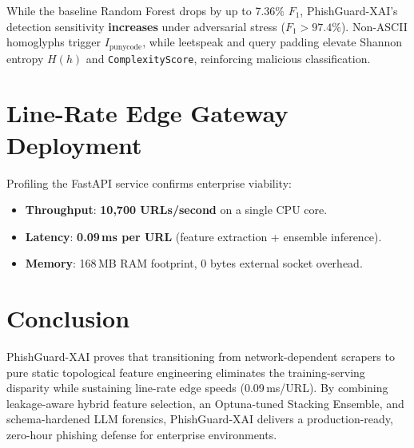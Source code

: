 \documentclass[conference]{IEEEtran}
\begin{document}
While the baseline Random Forest drops by up to 7.36\% $F_1$, PhishGuard-XAI's detection sensitivity \textbf{increases} under adversarial stress ($F_1 > 97.4\%$). Non-ASCII homoglyphs trigger $I_{\text{punycode}}$, while leetspeak and query padding elevate Shannon entropy $H(h)$ and \texttt{ComplexityScore}, reinforcing malicious classification.

\section{Line-Rate Edge Gateway Deployment}
Profiling the FastAPI service confirms enterprise viability:
\begin{itemize}
    \item \textbf{Throughput}: \textbf{10,700 URLs/second} on a single CPU core.
    \item \textbf{Latency}: \textbf{0.09\,ms per URL} (feature extraction + ensemble inference).
    \item \textbf{Memory}: 168\,MB RAM footprint, 0 bytes external socket overhead.
\end{itemize}

\section{Conclusion}
PhishGuard-XAI proves that transitioning from network-dependent scrapers to pure static topological feature engineering eliminates the training-serving disparity while sustaining line-rate edge speeds (0.09\,ms/URL). By combining leakage-aware hybrid feature selection, an Optuna-tuned Stacking Ensemble, and schema-hardened LLM forensics, PhishGuard-XAI delivers a production-ready, zero-hour phishing defense for enterprise environments.
\end{document}
